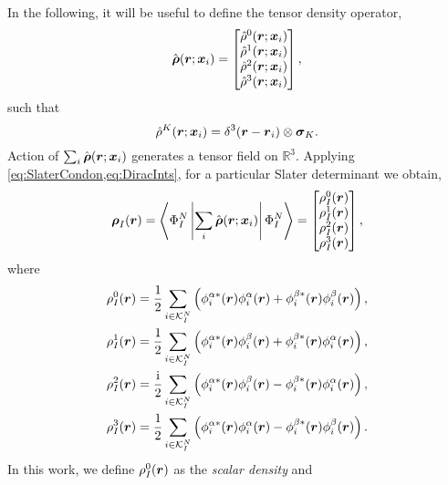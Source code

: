 In the following, it will be useful to define the tensor density operator,
\begin{equation}
  \label{eq:TensorDensity}
\hat{\boldsymbol{\rho}}(\boldsymbol{r};\boldsymbol{x}_i)  = \begin{bmatrix} \hat{\rho}^0(\boldsymbol{r};\boldsymbol{x}_i) \\ \hat{\rho}^1 (\boldsymbol{r};\boldsymbol{x}_i)\\\hat{\rho}^2(\boldsymbol{r};\boldsymbol{x}_i) \\ \hat{\rho}^3(\boldsymbol{r};\boldsymbol{x}_i) \end{bmatrix},
\end{equation}
such that
\begin{equation}
\hat{\rho}^K(\boldsymbol{r};\boldsymbol{x}_i) = \delta^3(\boldsymbol{r} - \boldsymbol{r}_i) \otimes \boldsymbol{\sigma}_{K}.
\end{equation}
Action of $\sum_i \hat{\boldsymbol{\rho}}(\boldsymbol{r};\boldsymbol{x}_i)$ generates a tensor field on $\mathbb R^3$. Applying \cref{eq:SlaterCondon,eq:DiracInts}, 
for a particular Slater determinant we obtain,
\begin{equation}
\boldsymbol{\rho}_I(\boldsymbol{r}) = \left\langle \Phi_I^N \left\vert \sum_i \hat{\boldsymbol{\rho}}(\boldsymbol{r};\boldsymbol{x}_i) \right\vert \Phi_I^N \right\rangle = 
\begin{bmatrix} {\rho_I^0}(\boldsymbol{r}) \\ {\rho_I^1} (\boldsymbol{r})\\{\rho_I^2}(\boldsymbol{r}) \\ {\rho_I^3}(\boldsymbol{r}) \end{bmatrix},
\end{equation}
where
\begin{subequations}
\begin{align}
  &\rho_I^0(\boldsymbol{r}) = \frac{1}{2}   \sum_{i\in\mathcal{K}^N_I}\left(\phi^{\alpha*}_i(\boldsymbol{r})\phi^{\alpha}_i(\boldsymbol{r}) + \phi^{\beta*}_i(\boldsymbol{r})\phi^{\beta}_i(\boldsymbol{r}) \right), \\
  &\rho_I^1(\boldsymbol{r}) = \frac{1}{2}   \sum_{i\in\mathcal{K}^N_I}\left(\phi^{\alpha*}_i(\boldsymbol{r})\phi^{\beta}_i(\boldsymbol{r}) + \phi^{\beta*}_i(\boldsymbol{r})\phi^{\alpha}_i(\boldsymbol{r}) \right), \\
  &\rho_I^2(\boldsymbol{r}) = \frac{\mathrm i}{2} \sum_{i\in\mathcal{K}^N_I}\left(\phi^{\alpha*}_i(\boldsymbol{r})\phi^{\beta}_i(\boldsymbol{r}) - \phi^{\beta*}_i(\boldsymbol{r})\phi^{\alpha}_i(\boldsymbol{r}) \right), \\
  &\rho_I^3(\boldsymbol{r}) = \frac{1}{2}   \sum_{i\in\mathcal{K}^N_I}\left(\phi^{\alpha*}_i(\boldsymbol{r})\phi^{\alpha}_i(\boldsymbol{r}) - \phi^{\beta*}_i(\boldsymbol{r})\phi^{\beta}_i(\boldsymbol{r}) \right). 
\end{align}
\end{subequations}
In this work, we define $\rho_I^0(\boldsymbol{r})$ as the \emph{scalar density} and 
